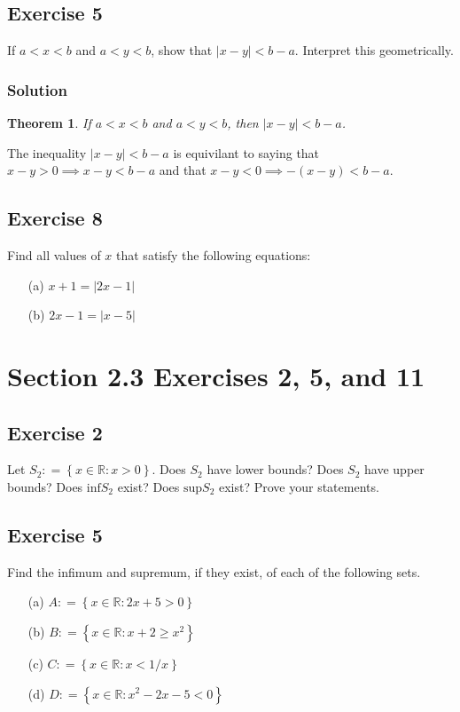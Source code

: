 \documentclass[12pt]{article}
\newtheorem*{thm}{Theorem}
\begin{document}
\subsection*{Exercise 5}
If $a < x < b$ and $a < y < b$, show that $\left|x - y\right| < b - a$. Interpret this geometrically.

\subsubsection*{Solution}
\begin{thm}
If $a < x < b$ and $a < y < b$, then $\left| x - y \right| < b - a$.
\end{thm}

The inequality $\left| x - y \right| < b - a$ is equivilant to saying that $x - y > 0 \implies x - y < b - a$ and that $x - y < 0 \implies -\left(x - y\right) < b - a$.

\subsection*{Exercise 8}
Find all values of $x$ that satisfy the following equations:
\begin{itemize}
\item[(a)] $x + 1 = \left|2x - 1\right|$
\item[(b)] $2x - 1 = \left|x - 5\right|$
\end{itemize}

\section*{Section 2.3 Exercises 2, 5, and 11}

\subsection*{Exercise 2}
Let $S_2 \mathrel{\mathop:}= \left\{x \in \mathbb{R} : x > 0\right\}$. Does $S_2$ have lower bounds? Does $S_2$ have upper bounds? Does $\text{inf}S_2$ exist? Does $\text{sup}S_2$ exist? Prove your statements.

\subsection*{Exercise 5}
Find the infimum and supremum, if they exist, of each of the following sets.
\begin{itemize}
\item[(a)] $A \mathrel{\mathop:}= \left\{x \in \mathbb{R} : 2x + 5 > 0\right\}$
\item[(b)] $B \mathrel{\mathop:}= \left\{x \in \mathbb{R} : x + 2 \geq x^2\right\}$
\item[(c)] $C \mathrel{\mathop:}= \left\{x \in \mathbb{R} : x < 1/x\right\}$
\item[(d)] $D \mathrel{\mathop:}= \left\{x \in \mathbb{R} : x^2 - 2x - 5 < 0\right\}$
\end{itemize}
\end{document}
